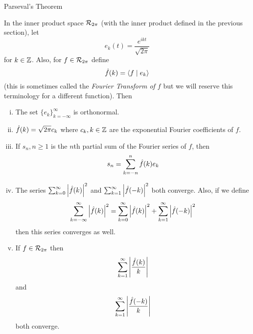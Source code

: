 \begin{section}{Parseval's Theorem}

\begin{prop}\label{prop:DefnOfEk}
	In the inner product space $\riemmint$ (with the inner
	product defined in the previous section), let
		\begin{displaymath}
			e_k(t) = \frac{e^{ikt}}{\sqrt{2\pi}}
		\end{displaymath}
	for $\isintgr[k]$. Also, for $f \in \riemmint$ define
		\begin{displaymath}
			\f(k) = \innerprod{f}{e_k}
		\end{displaymath}
	(this is sometimes called the \emph{Fourier Transform of $f$}
	but we will reserve this terminology for a different function).
	Then
		\begin{enumerate}[i)]
			\item
				The set $\{e_k\}_{k=-\infty}^\infty$ is orthonormal.
			\item
				$\f(k) = \sqrt{2\pi}c_k$ where $c_k, \isintgr[k]$ are
				the exponential Fourier coefficients of $f$.
			\item
				If $s_n, n \geq 1$ is the $n$th partial sum of the
				Fourier series of $f$, then
					\begin{displaymath}
						s_n = \sum_{k=-n}^n \f(k)e_k
					\end{displaymath}
			\item
				The series $\sum_{k=0}^\infty \modulus{\f(k)}^2$ and
				$\sum_{k=1}^\infty \modulus{\f(-k)}^2$ both converge.
				Also, if we define
					\begin{displaymath}
						\sum_{k=-\infty}^\infty \modulus{\f(k)}^2
							= \sum_{k=0}^\infty \modulus{\f(k)}^2
							+ \sum_{k=1}^\infty \modulus{\f(-k)}^2
					\end{displaymath}
				then this series converges as well.
			\item
				If $f \in \riemmint$ then
					\begin{displaymath}
						\sum_{k=1}^\infty \modulus{\frac{\f(k)}{k}}
					\end{displaymath}
				and
					\begin{displaymath}
						\sum_{k=1}^\infty \modulus{\frac{\f(-k)}{k}}
					\end{displaymath}
				both converge.
		\end{enumerate}
\end{prop}


\end{section}
